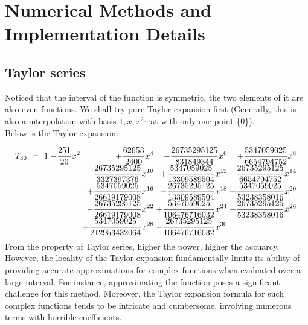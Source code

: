 \documentclass[11pt]{article}
\begin{document}
\section{Numerical Methods and Implementation Details} 

\subsection{Taylor series}
Noticed that the interval of the function is symmetric, the two elements of it are also even functions. We shall try pure Taylor expansion
first (Generally, this is also a interpolation with basis $1, x, x^{2}\cdots$at with only one point \{0\}).\\ Below is the Taylor expansion:


\begin{equation}
\setlength{\arraycolsep}{1ex}%
\begin{array}{@{}r@{\;}r@{\;}r@{\;}r@{\;}r@{\;}r@{}}
T_{30}\ =\ 1
&-\displaystyle\frac{251}{20}x^2
&+\displaystyle\frac{62653}{2400}x^4
&-\displaystyle\frac{26735295125}{831849344}x^6
&+\displaystyle\frac{5347059025}{6654794752}x^8
&\\[1ex]
%
& 
&-\displaystyle\frac{26735295125}{3327397376}x^{10}
&+\displaystyle\frac{5347059025}{13309589504}x^{12}
&-\displaystyle\frac{26735295125}{6654794752}x^{14}
&\\[1ex]
%
& 
&+\displaystyle\frac{5347059025}{26619179008}x^{16}
&-\displaystyle\frac{26735295125}{13309589504}x^{18}
&+\displaystyle\frac{5347059025}{53238358016}x^{20}
&\\[1ex]
%
& 
&-\displaystyle\frac{26735295125}{26619179008}x^{22}
&+\displaystyle\frac{5347059025}{106476716032}x^{24}
&-\displaystyle\frac{26735295125}{53238358016}x^{26}
&\\[1ex]
%
& 
&+\displaystyle\frac{5347059025}{212953432064}x^{28}
&-\displaystyle\frac{26735295125}{106476716032}x^{30}
\end{array}
\end{equation}
From the property of Taylor series, higher the power, higher the accuarcy. However, the locality of the Taylor expansion 
fundamentally limits its ability of providing accurate approximations for complex functions when evaluated over a large interval. 
For instance, approximating the function poses a significant challenge for this method. Moreover, the Taylor expansion formula 
for such complex functions tends to be intricate and cumbersome, involving numerous terms with horrible coefficients.\\
\end{document}
